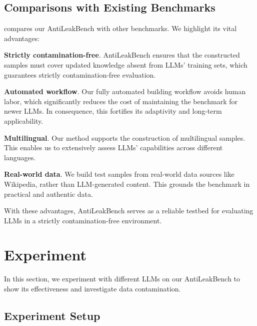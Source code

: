 \documentclass[11pt]{article}
\newcommand{\benchname}{{AntiLeakBench}\xspace}
\begin{document}
    \subsection{Comparisons with Existing Benchmarks}
         compares our \benchname with other benchmarks.
        We highlight its vital advantages:
        \begin{inparaenum}
            \item
                \textbf{Strictly contamination-free}.
                \benchname ensures that the constructed samples must cover updated knowledge absent from LLMs' training sets,
                which guarantees strictly contamination-free evaluation.
            \item
                \textbf{Automated workflow}.
                Our fully automated building workflow avoids human labor,
                which significantly reduces the cost of maintaining the benchmark for newer LLMs.
                In consequence, this fortifies its adaptivity and long-term applicability.
            \item \textbf{Multilingual}.
                Our method supports the construction of multilingual samples.
                This enables us to extensively assess LLMs' capabilities across different languages.
            \item
                \textbf{Real-world data}.
                We build test samples from real-world data sources like Wikipedia, rather than LLM-generated content.
                This grounds the benchmark in practical and authentic data.
        \end{inparaenum}
        With these advantages, \benchname serves as a reliable testbed for evaluating LLMs in a strictly contamination-free environment.



\section{Experiment}
    In this section, we experiment with different LLMs on our \benchname to  show its effectiveness and investigate data contamination.

    \subsection{Experiment Setup}
\end{document}

